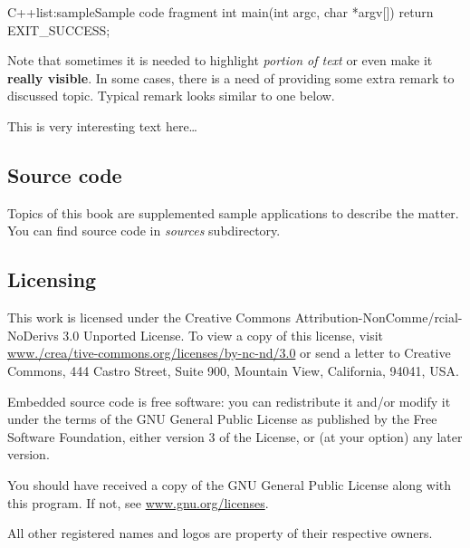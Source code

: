 \begin{fdoccode}{C++}{list:sample}{Sample code fragment}
int main(int argc, char *argv[]) {
	return EXIT_SUCCESS;
}
\end{fdoccode}

Note that sometimes it is needed to highlight \emph{portion of text} or even make it \textbf{really visible}. In some cases, there is a need of providing some extra remark to discussed topic. Typical remark looks similar to one below.

\begin{fdocextra}
This is very interesting text here\ldots
\end{fdocextra}

\subsection*{Source code}
Topics of this book are supplemented sample applications to describe the matter. You can find source code in \textit{sources} subdirectory.

\subsection*{Licensing}
This work is licensed under the Creative Commons Attribution-NonComme\-/rcial-NoDerivs 3.0 Unported License. To view a copy of this license, visit \href{http://www.creativecommons.org/licenses/by-nc-nd/3.0}{www.\-/crea\-/tive-commons.org/licenses/by-nc-nd/3.0} or send a letter to Creative Commons, 444 Castro Street, Suite 900, Mountain View, California, 94041, USA.

Embedded \cpp source code is free software: you can redistribute it and/or modify it under the terms of the GNU General Public License as published by the Free Software Foundation, either version 3 of the License, or (at your option) any later version.

You should have received a copy of the GNU General Public License along with this program. If not, see \href{http://www.gnu.org/licenses}{www.gnu.org/licenses}.

All other registered names and logos are property of their respective owners.